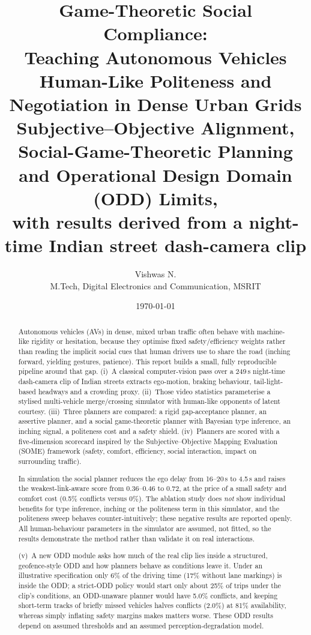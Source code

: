 \documentclass[11pt,a4paper]{article}
\title{\textbf{Game-Theoretic Social Compliance:\\ Teaching Autonomous Vehicles Human-Like Politeness and\\ Negotiation in Dense Urban Grids}\\[4pt]
\large Subjective--Objective Alignment, Social-Game-Theoretic Planning\\ and Operational Design Domain (ODD) Limits,\\ with results derived from a night-time Indian street dash-camera clip}
\author{Vishwas N.\\ M.Tech, Digital Electronics and Communication, MSRIT}
\date{\today}
\begin{document}
\maketitle

\begin{abstract}
Autonomous vehicles (AVs) in dense, mixed urban traffic often behave with machine-like rigidity or hesitation, because they optimise fixed safety/efficiency weights rather than reading the implicit social cues that human drivers use to share the road (inching forward, yielding gestures, patience). This report builds a small, fully reproducible pipeline around that gap. (i)~A classical computer-vision pass over a 249\,s night-time dash-camera clip of Indian streets extracts ego-motion, braking behaviour, tail-light-based headways and a crowding proxy. (ii)~Those video statistics parameterise a stylised multi-vehicle merge/crossing simulator with human-like opponents of latent courtesy. (iii)~Three planners are compared: a rigid gap-acceptance planner, an assertive planner, and a social game-theoretic planner with Bayesian type inference, an inching signal, a politeness cost and a safety shield. (iv)~Planners are scored with a five-dimension scorecard inspired by the Subjective--Objective Mapping Evaluation (SOME) framework (safety, comfort, efficiency, social interaction, impact on surrounding traffic).

In simulation the social planner reduces the ego delay from 16--20\,s to 4.5\,s and raises the weakest-link-aware score from 0.36--0.46 to 0.72, at the price of a small safety and comfort cost (0.5\% conflicts versus 0\%). The ablation study does \emph{not} show individual benefits for type inference, inching or the politeness term in this simulator, and the politeness sweep behaves counter-intuitively; these negative results are reported openly. All human-behaviour parameters in the simulator are assumed, not fitted, so the results demonstrate the method rather than validate it on real interactions.

(v)~A new ODD module asks how much of the real clip lies inside a structured, geofence-style ODD and how planners behave as conditions leave it. Under an illustrative specification only 6\% of the driving time (17\% without lane markings) is inside the ODD; a strict-ODD policy would start only about 25\% of trips under the clip's conditions, an ODD-unaware planner would have 5.0\% conflicts, and keeping short-term tracks of briefly missed vehicles halves conflicts (2.0\%) at 81\% availability, whereas simply inflating safety margins makes matters worse. These ODD results depend on assumed thresholds and an assumed perception-degradation model.
\end{abstract}
\end{document}
